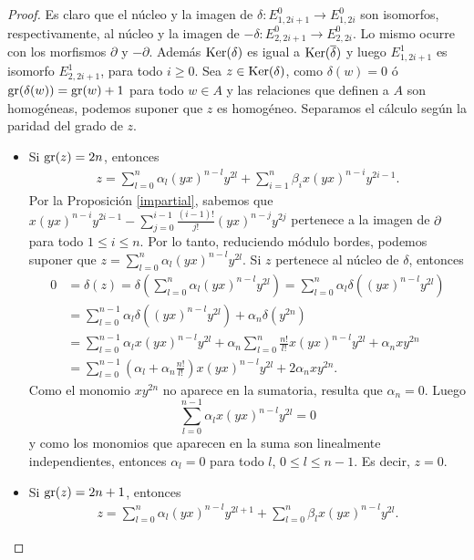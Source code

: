 \documentclass[fleqn,../tesis.tex]{subfiles}
\begin{document}
\begin{proof}
	Es claro que el núcleo y la imagen de $\delta:E^{0}_{1,2i + 1} \to E^{0}_{1, 2i}$ son isomorfos, respectivamente, al núcleo
	y la imagen de $-\delta:E^{0}_{2,2i + 1} \to E^{0}_{2, 2i}$. Lo mismo ocurre con los morfismos
	$\partial$ y $-\partial$. Además $\operatorname{Ker}(\delta)$ es igual a $\operatorname{Ker}(\overline{\delta})$
	y luego $E_{1,2i + 1}^1$ es isomorfo $E_{2, 2i + 1}^1$, para todo $i \geq 0$.
	Sea $z \in \operatorname{Ker}(\delta)$, como $\delta(w) = 0$ ó $\operatorname{gr}(\delta(w)) = \operatorname{gr}(w) + 1$ para todo $w \in A$
	y las relaciones que definen a $A$ son homogéneas, podemos suponer que $z$ es homogéneo.
	Separamos el cálculo según la paridad del grado de $z$.
	\begin{itemize}
		\item Si $\operatorname{gr}(z) = 2n$, entonces
		\begin{align*}
			z = \sum_{l = 0}^n\alpha_l(yx)^{n - l}y^{2l} + \sum_{i = 1}^n\beta_ix(yx)^{n - i}y^{2i - 1}.
		\end{align*}
		Por la Proposición \ref{impartial}, sabemos que $x(yx)^{n - i}y^{2i - 1} - \sum_{j = 0}^{i - 1}\frac{(i-1)!}{j!}(yx)^{n - j}y^{2j}$
		pertenece a la imagen de $\partial$ para todo $1 \leq i \leq n$.
		Por lo tanto, reduciendo módulo bordes, podemos suponer que $z = \sum_{l = 0}^n\alpha_l(yx)^{n - l}y^{2l}$.
		Si $z$ pertenece al núcleo de $\delta$, entonces
		\begin{align*}
			0 &= \delta(z) = \delta\left(\sum_{l = 0}^n\alpha_l(yx)^{n - l}y^{2l}\right) = \sum_{l = 0}^n\alpha_l\delta((yx)^{n - l}y^{2l}) \\
			&= \sum_{l = 0}^{n - 1}\alpha_l\delta((yx)^{n - l}y^{2l}) + \alpha_n\delta(y^{2n}) \\
				&= \sum_{l = 0}^{n - 1}\alpha_lx(yx)^{n - l}y^{2l} + \alpha_n\sum_{l = 0}^n \frac{n!}{l!}x(yx)^{n - l}y^{2l} + \alpha_nxy^{2n} \\
				&= \sum_{l = 0}^{n - 1}(\alpha_l + \alpha_n\frac{n!}{l!}) x(yx)^{n - l}y^{2l} + 2\alpha_nxy^{2n}.
		\end{align*}	
		Como el monomio $xy^{2n}$ no aparece en la sumatoria, resulta que $\alpha_n = 0$.
		Luego
		\[
			\sum_{l = 0}^{n - 1}\alpha_lx(yx)^{n - l}y^{2l} = 0
		\]
		y como los monomios que aparecen en la suma son linealmente independientes, entonces $\alpha_l = 0$ para todo $l$, $0 \leq l \leq n -1$.
		Es decir, $z = 0$.
		\item Si $\operatorname{gr}(z) = 2n + 1$, entonces
		\begin{align*}
			z = \sum_{l = 0}^n\alpha_l(yx)^{n - l}y^{2l + 1} + \sum_{l = 0}^n\beta_lx(yx)^{n - l}y^{2l}.

\end{align*}
\end{itemize}
\end{proof}
\end{document}
